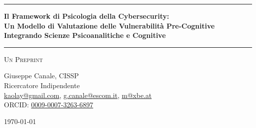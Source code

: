 \documentclass[11pt,a4paper]{article}
\begin{document}
\thispagestyle{empty}
\begin{center}

\vspace*{0.5cm}

\rule{\textwidth}{1.5pt}

\vspace{0.5cm}

{\LARGE \textbf{Il Framework di Psicologia della Cybersecurity:}}\\[0.3cm]
{\LARGE \textbf{Un Modello di Valutazione delle Vulnerabilità Pre-Cognitive}}\\[0.3cm]
{\LARGE \textbf{Integrando Scienze Psicoanalitiche e Cognitive}}

\vspace{0.5cm}

\rule{\textwidth}{1.5pt}

\vspace{0.3cm}

{\large \textsc{Un Preprint}}

\vspace{0.5cm}

{\Large Giuseppe Canale, CISSP}\\[0.2cm]
Ricercatore Indipendente\\[0.1cm]
\href{mailto:kaolay@gmail.com}{kaolay@gmail.com}, 
\href{mailto:g.canale@escom.it}{g.canale@escom.it}, 
\href{mailto:m8xbe.at}{m@xbe.at}\\[0.1cm]
ORCID: \href{https://orcid.org/0009-0007-3263-6897}{0009-0007-3263-6897}

\vspace{0.8cm}

{\large \today}

\vspace{1cm}

\end{center}
\end{document}
